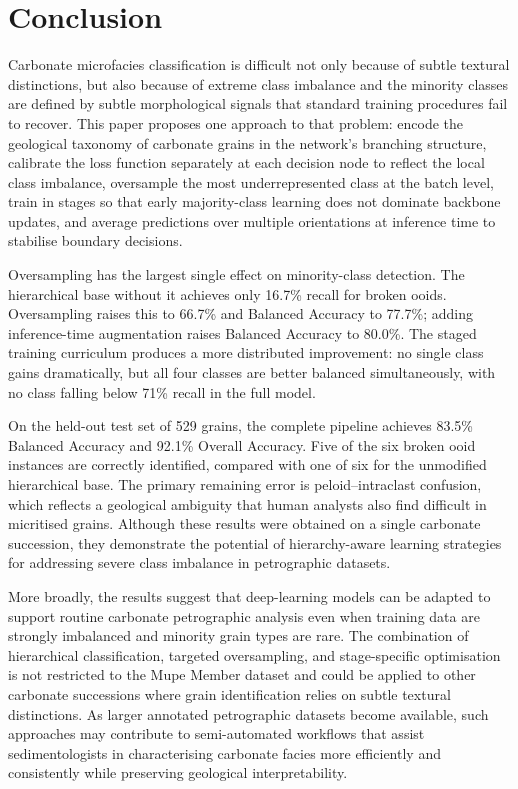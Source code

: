 \documentclass[a4paper,fleqn]{cas-dc}
\begin{document}
\section{Conclusion}

Carbonate microfacies classification is difficult not only because of subtle textural distinctions, but also because of extreme class imbalance and the minority classes are defined by subtle morphological signals that standard training procedures fail to recover. This paper proposes one approach to that problem: encode the geological taxonomy of carbonate grains in the network's branching structure, calibrate the loss function separately at each decision node to reflect the local class imbalance, oversample the most underrepresented class at the batch level, train in stages so that early majority-class learning does not dominate backbone updates, and average predictions over multiple orientations at inference time to stabilise boundary decisions.

Oversampling has the largest single effect on minority-class detection. The hierarchical base without it achieves only 16.7\% recall for broken ooids. Oversampling raises this to 66.7\% and Balanced Accuracy to 77.7\%; adding inference-time augmentation raises Balanced Accuracy to 80.0\%. The staged training curriculum produces a more distributed improvement: no single class gains dramatically, but all four classes are better balanced simultaneously, with no class falling below 71\% recall in the full model.

On the held-out test set of 529 grains, the complete pipeline achieves 83.5\% Balanced Accuracy and 92.1\% Overall Accuracy. Five of the six broken ooid instances are correctly identified, compared with one of six for the unmodified hierarchical base. The primary remaining error is peloid--intraclast confusion, which reflects a geological ambiguity that human analysts also find difficult in micritised grains. Although these results were obtained on a single carbonate succession, they demonstrate the potential of hierarchy-aware learning strategies for addressing severe class imbalance in petrographic datasets.

More broadly, the results suggest that deep-learning models can be adapted to support routine carbonate petrographic analysis even when training data are strongly imbalanced and minority grain types are rare. The combination of hierarchical classification, targeted oversampling, and stage-specific optimisation is not restricted to the Mupe Member dataset and could be applied to other carbonate successions where grain identification relies on subtle textural distinctions. As larger annotated petrographic datasets become available, such approaches may contribute to semi-automated workflows that assist sedimentologists in characterising carbonate facies more efficiently and consistently while preserving geological interpretability.
\end{document}
